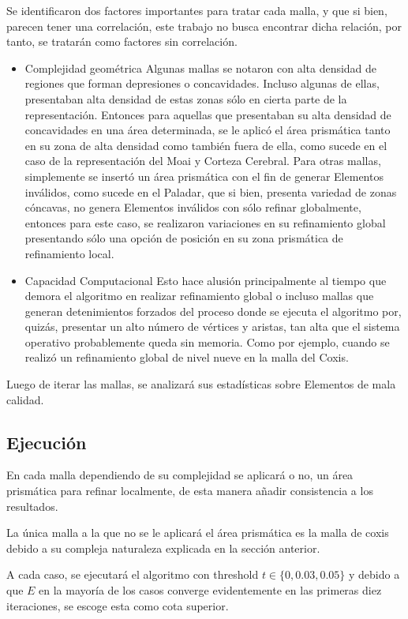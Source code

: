 Se identificaron dos factores importantes para tratar cada malla, y que si bien, parecen tener una correlación, este trabajo no busca encontrar dicha relación, por tanto, se tratarán como factores sin correlación.
\begin{itemize}
	\item Complejidad geométrica
		Algunas mallas se notaron con alta densidad de regiones que forman depresiones o concavidades. Incluso algunas de ellas, presentaban alta densidad de estas zonas sólo en cierta parte de la representación.
		Entonces para aquellas que presentaban su alta densidad de concavidades en una área determinada, se le aplicó el área prismática tanto en su zona de alta densidad como también fuera de ella, como sucede en el caso de la representación del Moai y Corteza Cerebral.
		Para otras mallas, simplemente se insertó un área prismática con el fin de generar Elementos inválidos, como sucede en el Paladar, que si bien, presenta variedad de zonas cóncavas, no genera Elementos inválidos con sólo refinar globalmente, entonces para este caso, se realizaron variaciones en su refinamiento global presentando sólo una opción de posición en su zona prismática de refinamiento local.
		
	\item Capacidad Computacional
		Esto hace alusión principalmente al tiempo que demora el algoritmo en realizar refinamiento global o incluso mallas que generan detenimientos forzados del proceso donde se ejecuta el algoritmo por, quizás, presentar un alto número de vértices y aristas, tan alta que el sistema operativo probablemente queda sin memoria. Como por ejemplo, cuando se realizó un refinamiento global de nivel nueve en la malla del Coxis.
\end{itemize}

Luego de iterar las mallas, se analizará sus estadísticas sobre Elementos de mala calidad.

\subsection{Ejecución}

En cada malla dependiendo de su complejidad se aplicará o no, un área prismática para refinar localmente, de esta manera añadir consistencia a los resultados.

La única malla a la que no se le aplicará el área prismática es la malla de coxis debido a su compleja naturaleza explicada en la sección anterior.

A cada caso, se ejecutará el algoritmo con threshold $t \in \{ 0, 0.03, 0.05 \}$ y debido a que $E$ en la mayoría de los casos converge evidentemente en las primeras diez iteraciones, se escoge esta como cota superior.

